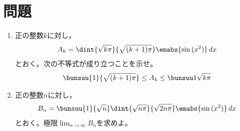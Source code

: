 \documentclass[../../../doc/main]{subfiles}
\begin{document}
    \setcounter{chapter}{1}
    \setcounter{section}{1}
    \section{問題}\label{問題1}
        \begin{tcolorbox}
            \begin{enumerate}
            \item [\kakkoichi] 正の整数$k$に対し，
                \begin{align*}
                    A_k=\dint{\sqrt{k\pi}}{\sqrt{(k+1)\pi}}\emabs{\sin{(x^2)}}\,dx
                \end{align*}
                とおく。次の不等式が成り立つことを示せ。
                \begin{align*}
                    \bunsuu{1}{\sqrt{(k+1)\pi}}\leq A_k\leq \bunsuu1{\sqrt{k\pi}}
                \end{align*}
            \item [\kakkoni] 正の整数$n$に対し，
                \begin{align*}
                    B_n=\bunsuu{1}{\sqrt{n}}\dint{\sqrt{n\pi}}{\sqrt{2n\pi}}\emabs{\sin{(x^2)}}\,dx
                \end{align*}
                とおく。極限$\displaystyle\lim_{n\to\infty}B_n$を求めよ。
            \end{enumerate}
        \end{tcolorbox}
\end{document}
